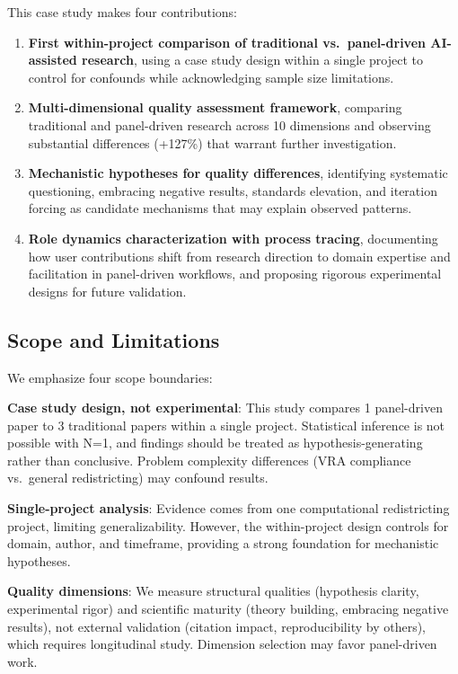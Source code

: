 This case study makes four contributions:

\begin{enumerate}[leftmargin=*]
\item \textbf{First within-project comparison of traditional vs.\ panel-driven AI-assisted research}, using a case study design within a single project to control for confounds while acknowledging sample size limitations.

\item \textbf{Multi-dimensional quality assessment framework}, comparing traditional and panel-driven research across 10 dimensions and observing substantial differences (+127\%) that warrant further investigation.

\item \textbf{Mechanistic hypotheses for quality differences}, identifying systematic questioning, embracing negative results, standards elevation, and iteration forcing as candidate mechanisms that may explain observed patterns.

\item \textbf{Role dynamics characterization with process tracing}, documenting how user contributions shift from research direction to domain expertise and facilitation in panel-driven workflows, and proposing rigorous experimental designs for future validation.
\end{enumerate}

\subsection{Scope and Limitations}

We emphasize four scope boundaries:

\textbf{Case study design, not experimental}: This study compares 1 panel-driven paper to 3 traditional papers within a single project. Statistical inference is not possible with N=1, and findings should be treated as hypothesis-generating rather than conclusive. Problem complexity differences (VRA compliance vs.\ general redistricting) may confound results.

\textbf{Single-project analysis}: Evidence comes from one computational redistricting project, limiting generalizability. However, the within-project design controls for domain, author, and timeframe, providing a strong foundation for mechanistic hypotheses.

\textbf{Quality dimensions}: We measure structural qualities (hypothesis clarity, experimental rigor) and scientific maturity (theory building, embracing negative results), not external validation (citation impact, reproducibility by others), which requires longitudinal study. Dimension selection may favor panel-driven work.

